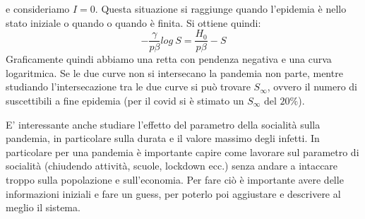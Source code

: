 \documentclass[12pt]{article}
\begin{document}
e consideriamo $I = 0$. Questa situazione si raggiunge quando l'epidemia è nello stato iniziale o quando o quando è finita. Si ottiene quindi:
\begin{equation}
	\boxed{-\frac{\gamma}{p \beta} log \ S = \frac{H_0}{p \beta} - S}
\end{equation}
Graficamente quindi abbiamo una retta con pendenza negativa e una curva logaritmica. Se le due curve non si intersecano la pandemia non parte, mentre studiando l'intersecazione tra le due curve si può trovare $S_{\infty}$, ovvero il numero di suscettibili a fine epidemia (per il covid si è stimato un $S_{\infty}$ del $20 \%$).
\begin{center}
\end{center}
E' interessante anche studiare l'effetto del parametro della socialità sulla pandemia, in particolare sulla durata e il valore massimo degli infetti. In particolare per una pandemia è importante capire come lavorare sul parametro di socialità (chiudendo attività, scuole, lockdown ecc.) senza andare a intaccare troppo sulla popolazione e sull'economia. Per fare ciò è importante avere delle informazioni iniziali e fare un guess, per poterlo poi aggiustare e descrivere al meglio il sistema.
\end{document}
